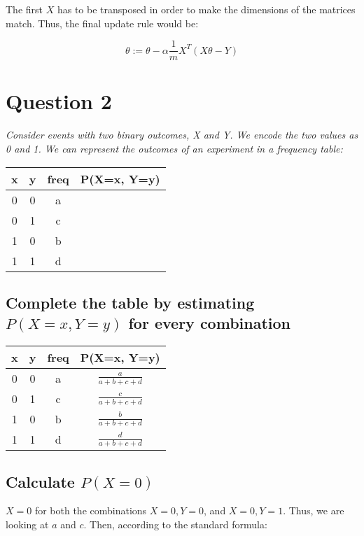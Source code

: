 \documentclass{article}
\begin{document}
	The first $X$ has to be transposed in order to make the dimensions of the matrices match. Thus, the final update rule would be:
	
	\begin{equation*}
	\theta := \theta - \alpha \frac{1}{m} X^T (X\theta - Y)
	\end{equation*}

\pagebreak

\section{Question 2}
\textit{Consider events with two binary outcomes, X and Y. We encode the two values as 0 and 1. We can represent
the outcomes of an experiment in a frequency table:}

\begin{table}[h!]
\centering
\begin{tabular}{c c c c}
 x & y & freq & P(X=x, Y=y)\\
\hline
0&0&a&\\
0&1&c&\\
1&0&b&\\
1&1&d&
\end{tabular}
\end{table}
 
\subsection{Complete the table by estimating $P(X=x,Y=y)$ for every combination}
	
	
	\begin{table}[h!]
	\centering
	\begin{tabular}{c c c c}
	 x & y & freq & P(X=x, Y=y)\\
	\hline
	0&0&a& $\frac{a}{a+b+c+d}$\\
	0&1&c& $\frac{c}{a+b+c+d}$\\
	1&0&b& $\frac{b}{a+b+c+d}$\\
	1&1&d& $\frac{d}{a+b+c+d}$
	\end{tabular}
	\end{table}
	
	
\subsection{Calculate $P(X=0)$}
	$X=0$ for both the combinations $ X=0, Y=0$, and $X=0, Y=1$. Thus, we are looking at $a$ and $c$. Then, according to the standard formula:
	
\end{document}
